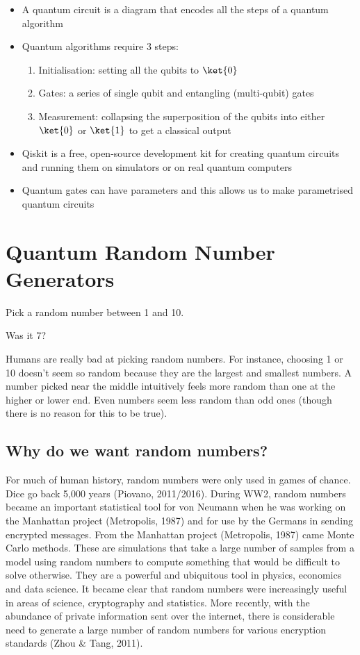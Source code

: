 \documentclass{book}
\begin{document}
\begin{itemize}
\item A quantum circuit is a diagram that encodes all the steps of a quantum algorithm
\item Quantum algorithms require 3 steps:
\begin{enumerate}
    \item Initialisation: setting all the qubits to $\ket{0}$
    \item Gates: a series of single qubit and entangling (multi-qubit) gates
    \item Measurement: collapsing the superposition of the qubits into either $\ket{0}$ or $\ket{1}$ to get a classical output 
\end{enumerate}
\item Qiskit is a free, open-source development kit for creating quantum circuits and running them on simulators or on real quantum computers
\item Quantum gates can have parameters and this allows us to make parametrised quantum circuits 

\end{itemize}
\chapter{Quantum Random Number Generators}

Pick a random number between 1 and 10. 

Was it 7?    

Humans are really bad at picking random numbers. For instance, choosing 1 or 10 doesn’t seem so random because they are the largest and smallest numbers. A number picked near the middle intuitively feels more random than one at the higher or lower end. Even numbers seem less random than odd ones (though there is no reason for this to be true). 


\section{Why do we want random numbers?}

For much of human history, random numbers were only used in games of chance. Dice go back 5,000 years (Piovano, 2011/2016). During WW2, random numbers became an important statistical tool for von Neumann when he was working on the Manhattan project (Metropolis, 1987) and for use by the Germans in sending encrypted messages. 
From the Manhattan project (Metropolis, 1987) came Monte Carlo methods. These are simulations that take a large number of samples from a model using random numbers to compute something that would be difficult to solve otherwise. They are a powerful and ubiquitous tool in physics, economics and data science. It became clear that random numbers were increasingly useful in areas of science, cryptography and statistics. More recently, with the abundance of private information sent over the internet, there is considerable need to generate a large number of random numbers for various encryption standards (Zhou \& Tang, 2011).
\end{document}
